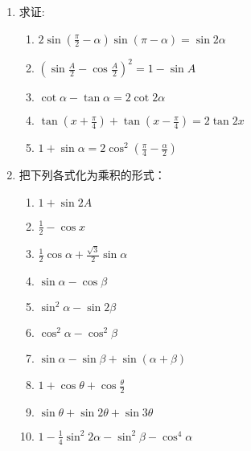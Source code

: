 \begin{enumerate}
\item 求证:
\begin{enumerate}
    \item $2 \sin \left(\frac{\pi}{2}-\alpha\right) \sin (\pi-\alpha)=\sin 2 \alpha$
    \item $\left(\sin \frac{A}{2}-\cos \frac{A}{2}\right)^{2}=1-\sin A$
    \item $\cot \alpha-\tan \alpha=2 \cot 2 \alpha$
\item $\tan\left(x+\frac{\pi}{4}\right)+\tan\left(x-\frac{\pi}{4}\right)=2\tan 2x$
\item $1+\sin\alpha=2\cos^2\left(\frac{\pi}{4}-\frac{\alpha}{2}\right)$
\end{enumerate}

\item 把下列各式化为乘积的形式：
\begin{multicols}{2}
\begin{enumerate}
    \item $1+\sin 2A$
    \item $\frac{1}{2}-\cos x$
    \item $\frac{1}{2}\cos\alpha+\frac{\sqrt{3}}{2}\sin\alpha$
    \item $\sin\alpha-\cos\beta$
    \item $\sin^2\alpha-\sin2\beta$
    \item $\cos^2\alpha-\cos^2\beta$
    \item $\sin\alpha-\sin\beta+\sin(\alpha+\beta)$
    \item $1+\cos\theta+\cos\frac{\theta}{2}$
    \item $\sin\theta+\sin2\theta+\sin3\theta$
    \item $1-\frac{1}{4}\sin^2 2\alpha-\sin^2\beta-\cos^4\alpha$
\end{enumerate}
\end{multicols}


\end{enumerate}
